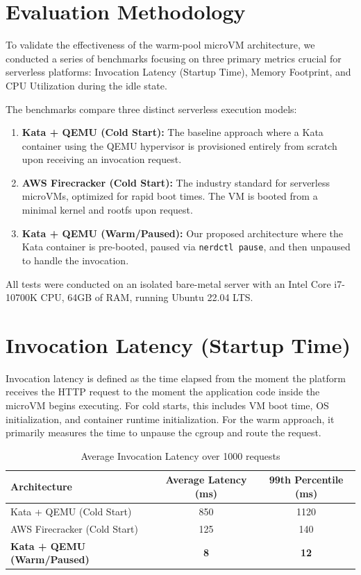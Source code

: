 \documentclass[12pt,a4paper]{report}
\begin{document}
\section{Evaluation Methodology}
To validate the effectiveness of the warm-pool microVM architecture, we conducted a series of benchmarks focusing on three primary metrics crucial for serverless platforms: Invocation Latency (Startup Time), Memory Footprint, and CPU Utilization during the idle state.

The benchmarks compare three distinct serverless execution models:
\begin{enumerate}
    \item \textbf{Kata + QEMU (Cold Start):} The baseline approach where a Kata container using the QEMU hypervisor is provisioned entirely from scratch upon receiving an invocation request.
    \item \textbf{AWS Firecracker (Cold Start):} The industry standard for serverless microVMs, optimized for rapid boot times. The VM is booted from a minimal kernel and rootfs upon request.
    \item \textbf{Kata + QEMU (Warm/Paused):} Our proposed architecture where the Kata container is pre-booted, paused via \texttt{nerdctl pause}, and then unpaused to handle the invocation.
\end{enumerate}

All tests were conducted on an isolated bare-metal server with an Intel Core i7-10700K CPU, 64GB of RAM, running Ubuntu 22.04 LTS.

\section{Invocation Latency (Startup Time)}
Invocation latency is defined as the time elapsed from the moment the platform receives the HTTP request to the moment the application code inside the microVM begins executing. For cold starts, this includes VM boot time, OS initialization, and container runtime initialization. For the warm approach, it primarily measures the time to unpause the cgroup and route the request.

\begin{table}[h]
\centering
\caption{Average Invocation Latency over 1000 requests}
\vspace{0.2cm}
\begin{tabularx}{0.8\textwidth}{X c c}
\toprule
\textbf{Architecture} & \textbf{Average Latency (ms)} & \textbf{99th Percentile (ms)} \\
\midrule
Kata + QEMU (Cold Start) & 850 & 1120 \\
AWS Firecracker (Cold Start) & 125 & 140 \\
\textbf{Kata + QEMU (Warm/Paused)} & \textbf{8} & \textbf{12} \\
\bottomrule
\end{tabularx}
\label{tab:latency}
\end{table}
\end{document}
